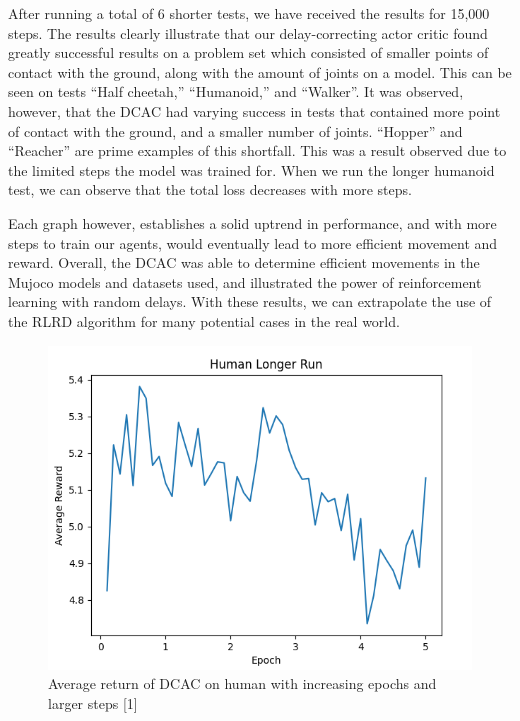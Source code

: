 \documentclass{article} %
\begin{document}
After running a total of 6 shorter tests, we have received the results for 15,000 steps. 
The results clearly illustrate that our delay-correcting actor critic found greatly successful results on a problem set which consisted of smaller points of contact with the ground, along with the amount of joints on a model. 
This can be seen on tests “Half cheetah,” “Humanoid,” and “Walker”. 
It was observed, however, that the DCAC had varying success in tests that contained more point of contact with the ground, and a smaller number of joints. 
“Hopper” and “Reacher”  are prime examples of this shortfall. 
This was a result observed due to the limited steps the model was trained for. 
When we run the longer humanoid test, we can observe that the total loss decreases with more steps.

Each graph however, establishes a solid uptrend in performance, and with more steps to train our agents, would eventually lead to more efficient movement and reward. 
Overall, the DCAC was able to determine efficient movements in the Mujoco models and datasets used, and illustrated the power of reinforcement learning with random delays. 
With these results, we can extrapolate the use of the RLRD algorithm for many potential cases in the real world.

\begin{figure}[H]
\begin{center}
\includegraphics[scale=0.4]{images/longer_human_reward.png}
\end{center}
\caption{Average return of DCAC on human with increasing epochs and larger steps [1]}
\label{averageReturnLong}
\end{figure}
\end{document}
